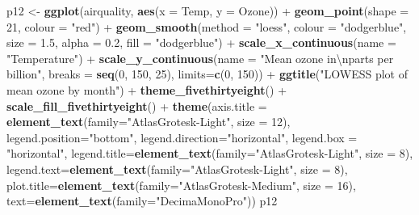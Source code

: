 \documentclass[]{article}
\newenvironment{Shaded}{\begin{snugshade}}{\end{snugshade}}
\newcommand{\KeywordTok}[1]{\textcolor[rgb]{0.13,0.29,0.53}{\textbf{{#1}}}}
\newcommand{\DataTypeTok}[1]{\textcolor[rgb]{0.13,0.29,0.53}{{#1}}}
\newcommand{\DecValTok}[1]{\textcolor[rgb]{0.00,0.00,0.81}{{#1}}}
\newcommand{\FloatTok}[1]{\textcolor[rgb]{0.00,0.00,0.81}{{#1}}}
\newcommand{\CharTok}[1]{\textcolor[rgb]{0.31,0.60,0.02}{{#1}}}
\newcommand{\StringTok}[1]{\textcolor[rgb]{0.31,0.60,0.02}{{#1}}}
\newcommand{\NormalTok}[1]{{#1}}
\begin{document}
\begin{Shaded}
\begin{Highlighting}[]
\NormalTok{p12 <-}\StringTok{ }\KeywordTok{ggplot}\NormalTok{(airquality, }\KeywordTok{aes}\NormalTok{(}\DataTypeTok{x =} \NormalTok{Temp, }\DataTypeTok{y =} \NormalTok{Ozone)) +}\StringTok{ }
\StringTok{  }\KeywordTok{geom_point}\NormalTok{(}\DataTypeTok{shape =} \DecValTok{21}\NormalTok{, }\DataTypeTok{colour =} \StringTok{"red"}\NormalTok{) +}\StringTok{ }
\StringTok{  }\KeywordTok{geom_smooth}\NormalTok{(}\DataTypeTok{method =} \StringTok{"loess"}\NormalTok{, }\DataTypeTok{colour =} \StringTok{"dodgerblue"}\NormalTok{, }\DataTypeTok{size =} \FloatTok{1.5}\NormalTok{, }
              \DataTypeTok{alpha =} \FloatTok{0.2}\NormalTok{, }\DataTypeTok{fill =} \StringTok{"dodgerblue"}\NormalTok{) +}
\StringTok{  }\KeywordTok{scale_x_continuous}\NormalTok{(}\DataTypeTok{name =} \StringTok{"Temperature"}\NormalTok{) +}
\StringTok{  }\KeywordTok{scale_y_continuous}\NormalTok{(}\DataTypeTok{name =} \StringTok{"Mean ozone in}\CharTok{\textbackslash{}n}\StringTok{parts per billion"}\NormalTok{,}
                     \DataTypeTok{breaks =} \KeywordTok{seq}\NormalTok{(}\DecValTok{0}\NormalTok{, }\DecValTok{150}\NormalTok{, }\DecValTok{25}\NormalTok{), }\DataTypeTok{limits=}\KeywordTok{c}\NormalTok{(}\DecValTok{0}\NormalTok{, }\DecValTok{150}\NormalTok{)) +}
\StringTok{  }\KeywordTok{ggtitle}\NormalTok{(}\StringTok{"LOWESS plot of mean ozone by month"}\NormalTok{) +}
\StringTok{  }\KeywordTok{theme_fivethirtyeight}\NormalTok{() +}\StringTok{ }\KeywordTok{scale_fill_fivethirtyeight}\NormalTok{() +}\StringTok{   }
\StringTok{  }\KeywordTok{theme}\NormalTok{(}\DataTypeTok{axis.title =} \KeywordTok{element_text}\NormalTok{(}\DataTypeTok{family=}\StringTok{"AtlasGrotesk-Light"}\NormalTok{, }\DataTypeTok{size =} \DecValTok{12}\NormalTok{),}
    \DataTypeTok{legend.position=}\StringTok{"bottom"}\NormalTok{, }
    \DataTypeTok{legend.direction=}\StringTok{"horizontal"}\NormalTok{,}
    \DataTypeTok{legend.box =} \StringTok{"horizontal"}\NormalTok{, }
    \DataTypeTok{legend.title=}\KeywordTok{element_text}\NormalTok{(}\DataTypeTok{family=}\StringTok{"AtlasGrotesk-Light"}\NormalTok{, }\DataTypeTok{size =} \DecValTok{8}\NormalTok{),}
    \DataTypeTok{legend.text=}\KeywordTok{element_text}\NormalTok{(}\DataTypeTok{family=}\StringTok{"AtlasGrotesk-Light"}\NormalTok{, }\DataTypeTok{size =} \DecValTok{8}\NormalTok{),}
    \DataTypeTok{plot.title=}\KeywordTok{element_text}\NormalTok{(}\DataTypeTok{family=}\StringTok{"AtlasGrotesk-Medium"}\NormalTok{, }\DataTypeTok{size =} \DecValTok{16}\NormalTok{), }
    \DataTypeTok{text=}\KeywordTok{element_text}\NormalTok{(}\DataTypeTok{family=}\StringTok{"DecimaMonoPro"}\NormalTok{)) }
\NormalTok{p12}
\end{Highlighting}
\end{Shaded}
\end{document}
